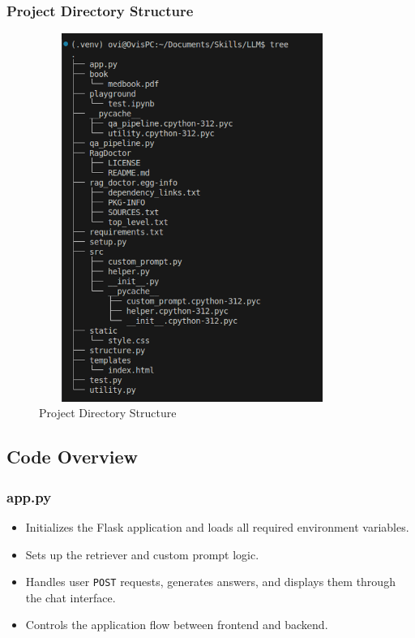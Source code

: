 \documentclass[12pt,a4paper]{report}
\begin{document}
\subsubsection{Project Directory Structure}
\begin{figure}[H]
    \centering
    \includegraphics[width=10cm, height=12cm]{ProjectDirectoryStrycture}
    \caption{Project Directory Structure}
    \label{fig:Project Directory Structure}
\end{figure}




\label{Code Overview}
\subsection{Code Overview}

\subsubsection{app.py}
\begin{itemize}
    \item Initializes the Flask application and loads all required environment variables.
    \item Sets up the retriever and custom prompt logic.
    \item Handles user \texttt{POST} requests, generates answers, and displays them through the chat interface.
    \item Controls the application flow between frontend and backend.
\end{itemize}
\end{document}
